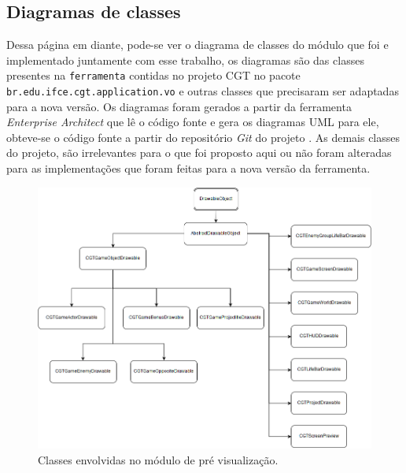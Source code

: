 \documentclass[12pt,oneside,openright,a4paper,english,brazil,sumario=tradicional]{abntex2}
\begin{document}
\begin{anexosenv}
   \chapter{Diagramas de classes}
   \label{chap:diagramas}
   Dessa página em diante, pode-se ver o diagrama de classes do módulo que foi e implementado juntamente com esse trabalho, os diagramas são das classes presentes na \texttt{ferramenta} contidas no projeto CGT no pacote \texttt{br.edu.ifce.cgt.application.vo} e outras classes que precisaram ser adaptadas para a nova versão. Os diagramas foram gerados a partir da ferramenta \textit{Enterprise Architect} que lê o código fonte e gera os diagramas UML para ele, obteve-se o código fonte a partir do repositório \textit{Git} do projeto \cite{website:projeto-cgt-repo}.
   As demais classes do projeto, são irrelevantes para o que foi proposto aqui ou não foram alteradas para as implementações que foram feitas para a nova versão da ferramenta.

   \begin{figure}[H]
   \centering
   \includegraphics[width=\textwidth]{images/classes.png}
   \caption{Classes envolvidas no módulo de pré visualização.}
   \label{fig:classes}
   \end{figure}

   
\end{anexosenv}
\printindex
\end{document}
